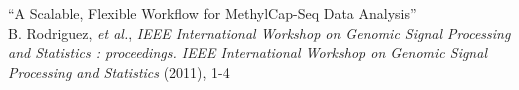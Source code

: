 ``A Scalable, Flexible Workflow for MethylCap-Seq Data Analysis'' \\
\small{B. Rodriguez, \textit{et al.}, \textit{IEEE International Workshop on Genomic Signal Processing and Statistics : proceedings. IEEE International Workshop on Genomic Signal Processing and Statistics} (2011), 1-4} \\

